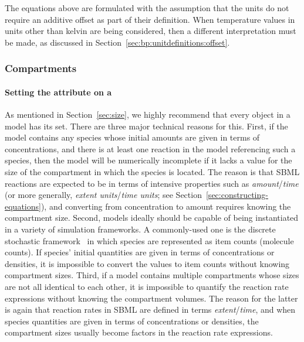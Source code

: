 The equations above are formulated with the assumption that the
units do not require an additive offset as part of their
definition.  When temperature values in units other than kelvin
are being considered, then a different interpretation must be
made, as discussed in Section~\ref{sec:bp:unitdefinitions:offset}.


\subsubsection{Compartments}
\label{sec:bp:compartment}


\paragraph{Setting the  attribute on a }
\label{sec:bp:size}

As mentioned in Section~\ref{sec:size}, we highly recommend that
every \Compartment object in a model has its  set.
There are three major technical reasons for this.  First, if the
model contains any species whose initial amounts are given in
terms of concentrations, and there is at least one reaction in the
model referencing such a species, then the model will be
numerically incomplete if it lacks a value for the size of the
compartment in which the species is located.  The reason is that
SBML reactions are expected to be in terms of intensive properties
such as \emph{amount}/\emph{time} (or more generally, \emph{extent
  units}/\emph{time units}; see
Section~\ref{sec:constructing-equations}), and converting from
concentration to amount requires knowing the compartment size.
Second, models ideally should be capable of being instantiated in
a variety of simulation frameworks.  A commonly-used one is the
discrete stochastic
framework~\citep{gillespie:1977,wilkinson_2006} in which species
are represented as item counts (\eg molecule counts).  If species'
initial quantities are given in terms of concentrations or
densities, it is impossible to convert the values to item counts
without knowing compartment sizes.  Third, if a model contains
multiple compartments whose sizes are not all identical to each
other, it is impossible to quantify the reaction rate expressions
without knowing the compartment volumes.  The reason for the
latter is again that reaction rates in SBML are defined in terms
\emph{extent}/\emph{time}, and when species quantities are given
in terms of concentrations or densities, the compartment sizes
usually become factors in the reaction rate expressions.


